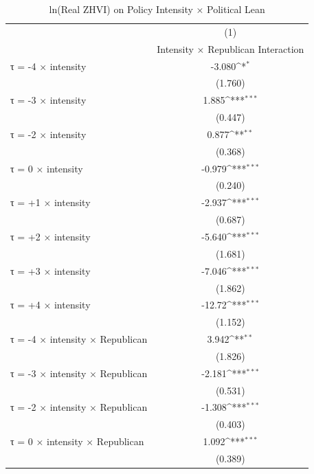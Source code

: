 \begin{table}[htbp]\centering
\def\sym#1{\ifmmode^{#1}\else\(^{#1}\)\fi}
\caption{ln(Real ZHVI) on Policy Intensity × Political Lean}
\label{tab:republican}
\begin{tabular}{l*{1}{c}}
\hline\hline
                    &\multicolumn{1}{c}{(1)}\\
                    &\multicolumn{1}{c}{Intensity × Republican Interaction}\\
\hline
τ = -4 × intensity  &      -3.080\sym{*}  \\
                    &     (1.760)         \\
[0.15em]
τ = -3 × intensity  &       1.885\sym{***}\\
                    &     (0.447)         \\
[0.15em]
τ = -2 × intensity  &       0.877\sym{**} \\
                    &     (0.368)         \\
[0.15em]
τ = 0 × intensity   &      -0.979\sym{***}\\
                    &     (0.240)         \\
[0.15em]
τ = +1 × intensity  &      -2.937\sym{***}\\
                    &     (0.687)         \\
[0.15em]
τ = +2 × intensity  &      -5.640\sym{***}\\
                    &     (1.681)         \\
[0.15em]
τ = +3 × intensity  &      -7.046\sym{***}\\
                    &     (1.862)         \\
[0.15em]
τ = +4 × intensity  &      -12.72\sym{***}\\
                    &     (1.152)         \\
[0.15em]
τ = -4 × intensity × Republican&       3.942\sym{**} \\
                    &     (1.826)         \\
[0.15em]
τ = -3 × intensity × Republican&      -2.181\sym{***}\\
                    &     (0.531)         \\
[0.15em]
τ = -2 × intensity × Republican&      -1.308\sym{***}\\
                    &     (0.403)         \\
[0.15em]
τ = 0 × intensity × Republican&       1.092\sym{***}\\
                    &     (0.389)         \\

\end{tabular}
\end{table}
